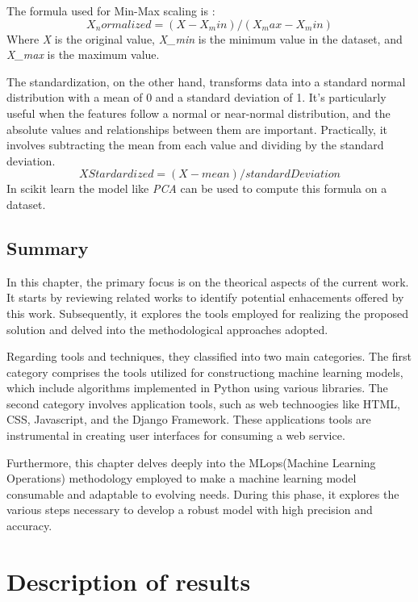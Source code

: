 \documentclass[12pt,a4paper]{report}
\begin{document}
The formula used for Min-Max scaling is : 
\begin{equation}
	X_normalized = (X-X_min)/(X_max - X_min)
\end{equation} 
Where \textit{X} is the original value, \textit{X\_min} is the minimum value in the dataset, and \textit{X\_max} is the maximum value.

The standardization, on the other hand, transforms data into a standard normal distribution with a mean of 0 and a standard deviation of 1. It's particularly useful when the features follow a normal or near-normal distribution, and the absolute values and relationships between them are important. Practically, it involves subtracting the mean from each value and dividing by the standard deviation. 
\begin{equation}
	XStardardized = (X - mean) / standardDeviation
\end{equation}
In scikit learn the model like \textit{PCA} can be used to compute this formula on a dataset.
\section{Summary}
In this chapter, the primary focus is on the theorical aspects of the current work. It starts by reviewing related works to identify potential enhacements offered by this work. Subsequently, it explores the tools employed for realizing the proposed solution and delved into the methodological approaches adopted.

Regarding tools and techniques, they classified into two main categories. The first category comprises the tools utilized for constructiong machine learning models, which include algorithms implemented in Python using various libraries.
The second category involves application tools, such as web technoogies like HTML, CSS, Javascript, and the Django Framework. These applications tools are instrumental in creating user interfaces for consuming a web service.

Furthermore, this chapter delves deeply into the MLops(Machine Learning Operations) methodology employed to make a machine learning model consumable and adaptable to evolving needs. During this phase, it explores the various steps necessary to develop a robust model with high precision and accuracy.
\chapter{Description of results} 
\newpage


\newpage	
	
	
	
	
	
	
	
\end{document}
